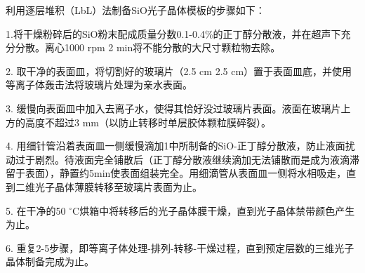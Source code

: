 利用逐层堆积（LbL）法制备SiO光子晶体模板的步骤如下：

1.将干燥粉碎后的SiO粉末配成质量分数0.1-0.4\%的正丁醇分散液，并在超声下充分分散。离心1000 rpm 2 min将不能分散的大尺寸颗粒物去除。

2. 取干净的表面皿，将切割好的玻璃片（2.5 cm \text{$\times$} 2.5 cm）置于表面皿底，并使用等离子体轰击法将玻璃片处理为亲水表面。

3. 缓慢向表面皿中加入去离子水，使得其恰好没过玻璃片表面。液面在玻璃片上方的高度不超过3 mm（以防止转移时单层胶体颗粒膜碎裂）。

4. 用细针管沿着表面皿一侧缓慢滴加1中所制备的SiO-正丁醇分散液，防止液面扰动过于剧烈。待液面完全铺散后（正丁醇分散液继续滴加无法铺散而是成为液滴滞留于表面），静置约5min使表面组装完全。用细滴管从表面皿一侧将水相吸走，直到二维光子晶体薄膜转移至玻璃片表面为止。

5. 在干净的50 $^{\circ}$C烘箱中将转移后的光子晶体膜干燥，直到光子晶体禁带颜色产生为止。

6. 重复2-5步骤，即等离子体处理-排列-转移-干燥过程，直到预定层数的三维光子晶体制备完成为止。


